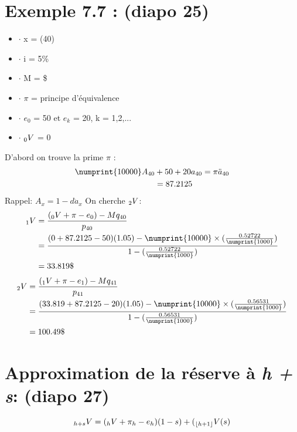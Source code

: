 \documentclass[11pt,french]{report}
\newcommand{\indiceGauche}[2]{{\vphantom{#2}}_{#1}#2}
\begin{document}
\section{Exemple 7.7 : (diapo 25)}
\begin{itemize}
\item $ \cdot $ x = (40)
\item $ \cdot $ i = 5\%
\item $ \cdot $ M = \$
\item $ \cdot $ $\pi$ = principe d'équivalence
\item $ \cdot $ $e_{0}$ = 50 et $e_{k}$ = 20, k = 1,2,...
\item $ \cdot $ $\indiceGauche{0}{V}$ = 0
\end{itemize}
D'abord on trouve la prime $\pi$ :
\begin{align*}
\numprint{10000}A_{40} &+ 50 + 20 a_{40}  = \pi \ddot{a}_{40}\\
&=87.2125
\end{align*}
Rappel: $A_x = 1 - d \ddot{a}_{x}$
On cherche $\indiceGauche{2}{V}$:
\begin{align*}
\indiceGauche{1}{V} &= \frac{(\indiceGauche{0}{V} + \pi - e_0) - M q_{40}}{p_{40}}\\
&= \frac{(0 + 87.2125 - 50)(1.05) - \numprint{10000}\times  (\frac{0.52722}{\numprint{1000}})}{1 - (\frac{0.52722}{\numprint{1000}})}\\
&= 33.819\$
\end{align*}
\begin{align*}
\indiceGauche{2}{V} &= \frac{(\indiceGauche{1}{V} + \pi - e_1) - M q_{41}}{p_{41}}\\
&= \frac{(33.819 + 87.2125 - 20)(1.05) - \numprint{10000}\times  (\frac{0.56531}{\numprint{1000}})}{1 - (\frac{0.56531}{\numprint{1000}})}\\
&= 100.49\$
\end{align*}

\section{Approximation de la réserve à \textit{h + s}: (diapo 27)}
\begin{equation}
\label{eq:appro:reser}
\indiceGauche{h+s}{V} = (\indiceGauche{h}{V} + \pi_h - e_h)(1-s) + (\indiceGauche{\lfloor h+1 \rfloor}{V}(s)
\end{equation}
\end{document}
